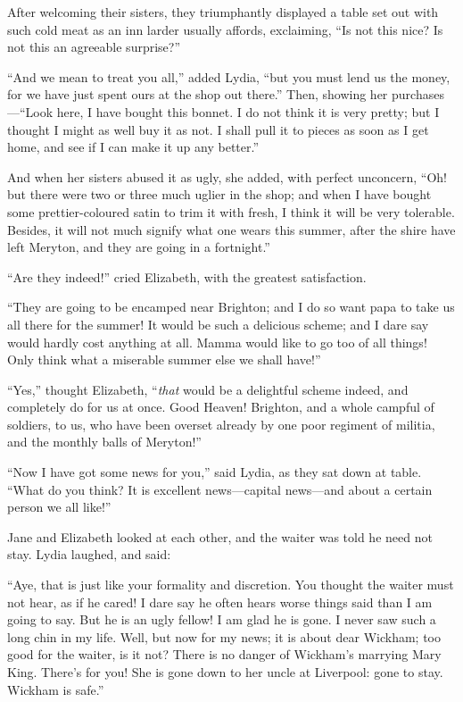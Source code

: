 After welcoming their sisters, they triumphantly displayed a table
set out with such cold meat as an inn larder usually affords,
exclaiming, ``Is not this nice?  Is not this an agreeable surprise?''

``And we mean to treat you all,'' added Lydia, ``but you must lend
us the money, for we have just spent ours at the shop out there.''
Then, showing her purchases---``Look here, I have bought this bonnet.
I do not think it is very pretty; but I thought I might as well
buy it as not.  I shall pull it to pieces as soon as I get home,
and see if I can make it up any better.''

And when her sisters abused it as ugly, she added, with perfect
unconcern, ``Oh! but there were two or three much uglier in the
shop; and when I have bought some prettier-coloured satin to
trim it with fresh, I think it will be very tolerable.  Besides,
it will not much signify what one wears this summer, after the
\gdash{}shire have left Meryton, and they are going in a fortnight.''

``Are they indeed!'' cried Elizabeth, with the greatest satisfaction.

``They are going to be encamped near Brighton; and I do so
want papa to take us all there for the summer!  It would be such
a delicious scheme; and I dare say would hardly cost anything at
all.  Mamma would like to go too of all things!  Only think what
a miserable summer else we shall have!''

``Yes,'' thought Elizabeth, ``\emph{that} would be a delightful scheme
indeed, and completely do for us at once.  Good Heaven!
Brighton, and a whole campful of soldiers, to us, who have been
overset already by one poor regiment of militia, and the monthly
balls of Meryton!''

``Now I have got some news for you,'' said Lydia, as they sat down
at table.  ``What do you think?  It is excellent news---capital
news---and about a certain person we all like!''

Jane and Elizabeth looked at each other, and the waiter was told
he need not stay.  Lydia laughed, and said:

``Aye, that is just like your formality and discretion.  You
thought the waiter must not hear, as if he cared!  I dare say he
often hears worse things said than I am going to say.  But he is
an ugly fellow!  I am glad he is gone.  I never saw such a long
chin in my life.  Well, but now for my news; it is about dear
Wickham; too good for the waiter, is it not?  There is no danger
of Wickham's marrying Mary King.  There's for you!  She is gone
down to her uncle at Liverpool: gone to stay.  Wickham is safe.''

